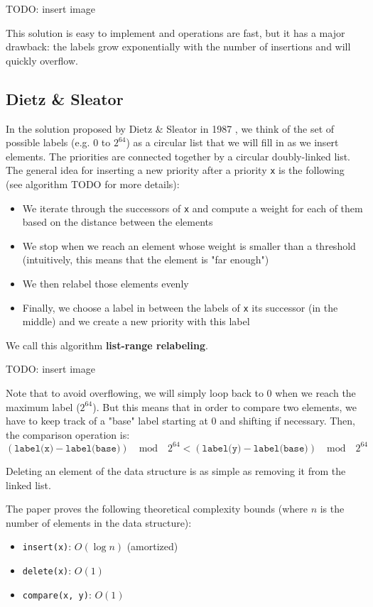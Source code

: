 \documentclass[12pt]{article}
\begin{document}
TODO: insert image

This solution is easy to implement and operations are fast, but it has a major drawback: the labels grow exponentially with the number of insertions and will quickly overflow.

\subsection{Dietz \& Sleator}

In the solution proposed by Dietz \& Sleator in 1987 \cite{10.1145/28395.28434}, we think of the set of possible labels (e.g. $0$ to $2^{64}$) as a circular list that we will fill in as we insert elements.
The priorities are connected together by a circular doubly-linked list.
The general idea for inserting a new priority after a priority \texttt{x} is the following (see algorithm TODO for more details):
\begin{itemize}
  \item We iterate through the successors of \texttt{x} and compute a weight for each of them based on the distance between the elements
  \item We stop when we reach an element whose weight is smaller than a threshold (intuitively, this means that the element is "far enough")
  \item We then relabel those elements evenly
  \item Finally, we choose a label in between the labels of \texttt{x} its successor (in the middle) and we create a new priority with this label
\end{itemize}

We call this algorithm \textbf{list-range relabeling}.

TODO: insert image

Note that to avoid overflowing, we will simply loop back to 0 when we reach the maximum label ($2^{64}$).
But this means that in order to compare two elements, we have to keep track of a "base" label starting at 0 and shifting if necessary.
Then, the comparison operation is:
$$ (\texttt{label(x)} - \texttt{label(base)}) \quad \text{mod} \quad 2^{64} < (\texttt{label(y)} - \texttt{label(base)}) \quad \text{mod} \quad 2^{64} $$

Deleting an element of the data structure is as simple as removing it from the linked list.

The paper proves the following theoretical complexity bounds (where $n$ is the number of elements in the data structure):
\begin{itemize}
  \item \texttt{insert(x)}: $O(\log n)$ (amortized)
  \item \texttt{delete(x)}: $O(1)$
  \item \texttt{compare(x, y)}: $O(1)$
\end{itemize}
\end{document}
